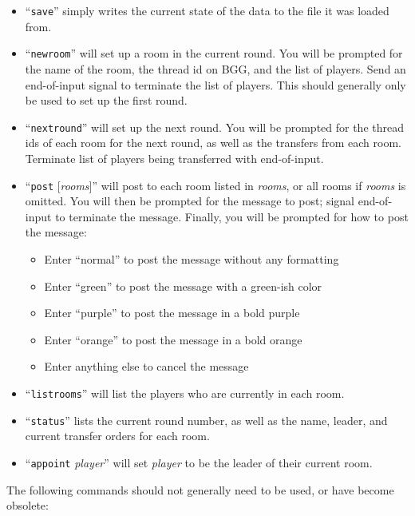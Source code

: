 \documentclass{report}
\begin{document}
\begin{itemize}
\item ``\texttt{save}'' simply writes the current state of the data to the file it was loaded from.
\item ``\texttt{newroom}'' will set up a room in the current round. You will be prompted for the name of the room, the thread id on BGG, and the list of players. Send an end-of-input signal to terminate the list of players. This should generally only be used to set up the first round.
\item ``\texttt{nextround}'' will set up the next round. You will be prompted for the thread ids of each room for the next round, as well as the transfers from each room. Terminate list of players being transferred with end-of-input.
\item ``\texttt{post} [\textit{rooms}]'' will post to each room listed in \textit{rooms}, or all rooms if \textit{rooms} is omitted. You will then be prompted for the message to post; signal end-of-input to terminate the message. Finally, you will be prompted for how to post the message:
\begin{itemize}
\item Enter ``normal'' to post the message without any formatting
\item Enter ``green'' to post the message with a green-ish color
\item Enter ``purple'' to post the message in a bold purple
\item Enter ``orange'' to post the message in a bold orange
\item Enter anything else to cancel the message
\end{itemize}
\item ``\texttt{listrooms}'' will list the players who are currently in each room.
\item ``\texttt{status}'' lists the current round number, as well as the name, leader, and current transfer orders for each room.
\item ``\texttt{appoint} \textit{player}'' will set \textit{player} to be the leader of their current room.
\end{itemize}
The following commands should not generally need to be used, or have become obsolete:
\end{document}
